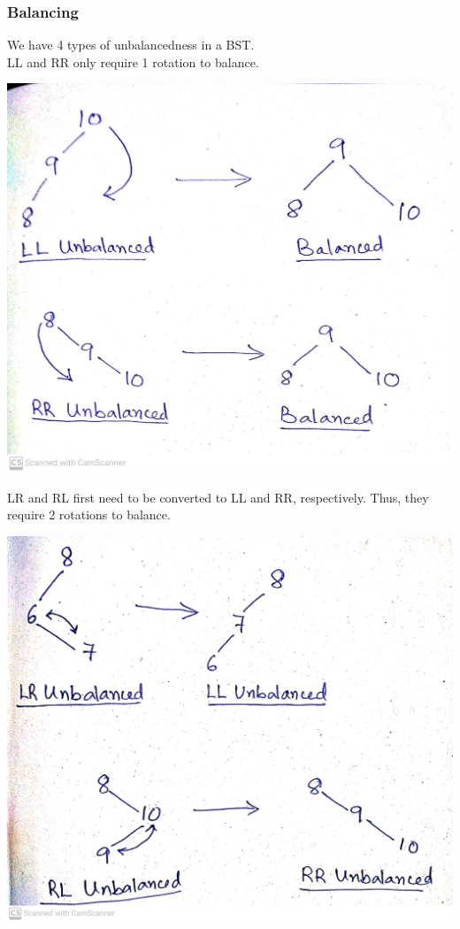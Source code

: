 \documentclass[10pt, a4paper]{extarticle}
\theoremstyle{definition}
\begin{document}
	\subsubsection{Balancing}
	We have 4 types of unbalancedness in a BST.\\
	LL and RR only require 1 rotation to balance.
		\begin{center}
			\includegraphics[scale=0.09]{LL-RR.jpg}\\
		\end{center}
		LR and RL first need to be converted to LL and RR, respectively. Thus, they require 2 rotations to balance.
		\begin{center}
			\includegraphics[scale=0.08]{LR-RL.jpg}\\
		\end{center}
\end{document}
